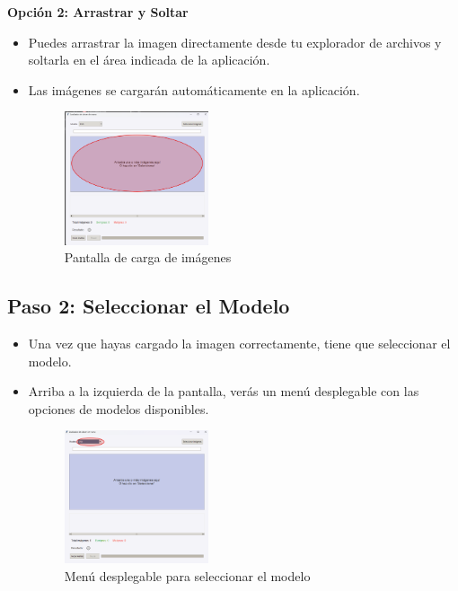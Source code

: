 \documentclass[12pt]{article} %
\begin{document}
\textbf{Opción 2: Arrastrar y Soltar}
\begin{itemize}
    \item Puedes arrastrar la imagen directamente desde tu explorador de archivos y soltarla en el área indicada de la aplicación.
    \item Las imágenes se cargarán automáticamente en la aplicación.
    \begin{figure}[!ht]
        \centering
        \includegraphics[width=0.4\textwidth]{ArrastrarySoltar.png}
        \caption{Pantalla de carga de imágenes}
        \label{fig:imagen_carga_arrastrar}
    \end{figure}
\end{itemize}

\newpage
\subsection*{Paso 2: Seleccionar el Modelo}

\begin{itemize}
    \item Una vez que hayas cargado la imagen correctamente, tiene que seleccionar el modelo.
    \item Arriba a la izquierda de la pantalla, verás un menú desplegable con las opciones de modelos disponibles.
    \begin{figure}[!ht]
        \centering
        \includegraphics[width=0.4\textwidth]{SeleccionarModelo.png}
        \caption{Menú desplegable para seleccionar el modelo}
        \label{fig:seleccionar_imagen}
    \end{figure}
\end{itemize}
\end{document}
